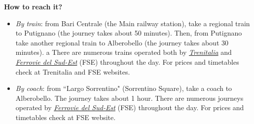 \documentclass[
	openany, %
	parskip=full, %
	12pt, %
	a4paper, %
]{conferencebooklet} %
\newcommand\smallbull{\scaleobj{0.7}{\blacksquare}}
\newcommand\itema{\item[\textcolor{case_blue}{$\smallbull$}]}
\begin{document}
\begin{adjustwidth}{10pt}{20pt}
\vspace{-2mm}
            
\vspace{-4mm}
\textbf{How to reach it?}
\vspace{-5mm}
\begin{itemize}[leftmargin=*, noitemsep]
        \itema \textit{By train}: from Bari Centrale (the Main railway station), take a regional train to Putignano (the journey takes about 50 minutes). Then, from Putignano take another regional train to Alberobello (the journey takes about 30 minutes). a There are numerous trains operated both by \color{blue}\href{https://www.trenitalia.com/en.html}{\textit{Trenitalia}} \color{black} and \color{blue}\href{https://www.fseonline.it/s/?language=it}{\textit{Ferrovie del Sud-Est}} \color{black} (FSE) throughout the day. For prices and timetables check at Trenitalia and FSE websites.
        \itema \textit{By coach}: from ``Largo Sorrentino" (Sorrentino Square), take a coach to Alberobello. The journey takes about 1 hour. There are numerous journeys operated by \color{blue}\href{https://www.fseonline.it/s/?language=it}{\textit{Ferrovie del Sud-Est}} \color{black} (FSE) throughout the day. For prices and timetables check at FSE website.
    \end{itemize}

\vspace{-2mm}
\begin{table}[h!]
\end{table}
\end{adjustwidth}
\end{document}
